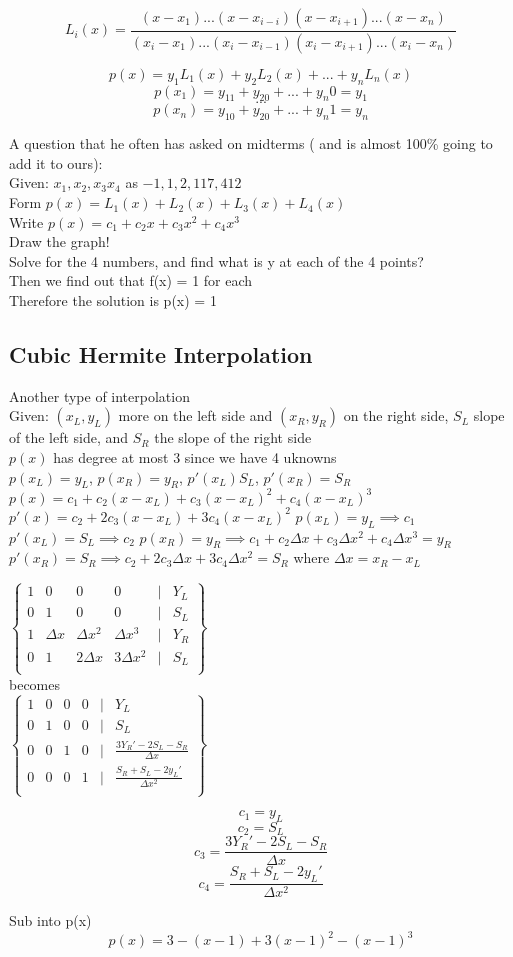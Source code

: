 \documentclass[12pt]{article}
\begin{document}
	$$L_i(x) = \frac{(x-x_1)...(x-x_{i-i})(x-x_{i+1})...(x-x_n)}{(x_i-x_1)...(x_i-x_{i-1})(x_i-x_{i+1})...(x_i-x_n)}$$
	
	$$p(x) = y_1L_1(x) + y_2L_2(x) + ... + y_nL_n(x)$$
	$$p(x_1) = y_11 + y_20 + ... + y_n0 = y_1$$
	$$...$$
	$$p(x_n) = y_10 + y_20 + ... + y_n1 = y_n$$
	
	A question that he often has asked on midterms ( and is almost 100\% going to add it to ours):\\
	Given: $x_1,x_2,x_3x_4$ as $-1,1,2,117,412$\\
	Form $p(x) = L_1(x) + L_2(x) + L_3(x) + L_4(x)$\\
	Write $p(x) = c_1 + c_2x + c_3x^2 + c_4x^3$\\
	
	Draw the graph!\\
	Solve for the 4 numbers, and find what is y at each of the 4 points?\\
	Then we find out that f(x) = 1 for each\\
	Therefore the solution is p(x) = 1\\
	
	\subsection*{Cubic Hermite Interpolation}
	Another type of interpolation\\
	
	Given: $(x_L, y_L)$ more on the left side and $(x_R, y_R)$ on the right side, $S_L$ slope of the left side, and $S_R$ the slope of the right side\\
	
	$p(x)$ has degree at most 3 since we have 4 uknowns\\
	$p(x_L) = y_L$, $p(x_R) = y_R$, $p'(x_L) S_L$, $p'(x_R) = S_R$\\
	
	$p(x) = c_1 + c_2(x-x_L) + c_3(x-x_L)^2 + c_4(x-x_L)^3$
	$p'(x) = c_2 + 2c_3(x-x_L) + 3c_4(x-x_L)^2$
	$p(x_L) = y_L \implies c_1$
	$p'(x_L) = S_L \implies c_2$
	$p(x_R) = y_R \implies c_1 + c_2\Delta x + c_3\Delta x^2 + c_4 \Delta x^3 = y_R$
	$p'(x_R) = S_R \implies c_2 + 2c_3\Delta x + 3c_4\Delta x^2 = S_R$
	where $\Delta x = x_R - x_L$
	
	$
	\begin{Bmatrix}
	 1 & 0 & 0 & 0 & | & Y_L \\
	 0 & 1 & 0 & 0 & | & S_L \\
	 1 & \Delta x & \Delta x^2 & \Delta x^3 & | & Y_R \\
	 0 & 1 & 2\Delta x & 3\Delta x^2 & | & S_L \\
	\end{Bmatrix}
	$\\
	becomes\\ 	
	$
	\begin{Bmatrix}
	1 & 0 & 0 & 0 & | & Y_L \\
	0 & 1 & 0 & 0 & | & S_L \\
	0 & 0 & 1 & 0 & | & \frac{3Y_R' - 2S_L - S_R}{\Delta x} \\
	0 & 0 & 0 & 1 & | & \frac{S_R + S_L - 2y_L'}{\Delta x^2} \\
	\end{Bmatrix}
	$
	
	$$c_1 = y_L$$
	$$c_2 = S_L$$
	$$c_3 = \frac{3Y_R' - 2S_L - S_R}{\Delta x}$$
	$$c_4 = \frac{S_R + S_L - 2y_L'}{\Delta x^2}$$
	
	Sub into p(x)\\
	$$p(x) = 3 - (x-1) + 3(x-1)^2 - (x-1)^3$$
	
	
	
\end{document}
